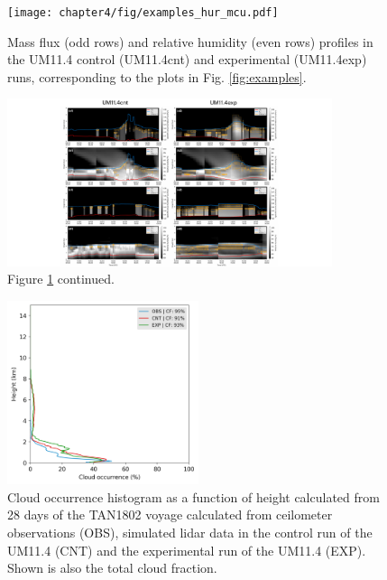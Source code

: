 \clearpage

\begin{figure}[t]
\centering
\texttt{[image: chapter4/fig/examples\_hur\_mcu.pdf]}
\caption[Mass flux and relative humidity profiles]{Mass flux (odd rows) and relative humidity (even rows) profiles in the UM11.4 control (UM11.4cnt)
and experimental (UM11.4exp) runs, corresponding to the plots in Fig. \ref{fig:examples}.
}
\label{fig:examples-hur-mcu}
\end{figure}

\clearpage

\begin{figure}[t]
\centering
\includegraphics[width=0.85\textwidth]{chapter4/fig/examples_hur_mcu_cont.pdf}
\caption{Figure \ref{fig:examples-hur-mcu} continued.
}
\label{fig:examples-hur-mcu-cont}
\end{figure}

\clearpage

\begin{figure}[t]
\centering
\includegraphics[width=0.5\textwidth]{chapter4/fig/cloud_occurrence.png}
\caption[Cloud occurrence histogram as a function of height]{
Cloud occurrence histogram as a function of height calculated from
28 days of the TAN1802 voyage calculated from ceilometer observations (OBS),
simulated lidar data in the control run of the UM11.4 (CNT) and
the experimental run of the UM11.4 (EXP).
Shown is also the total cloud fraction.
}
\label{fig:cloud-occurrence}
\end{figure}

